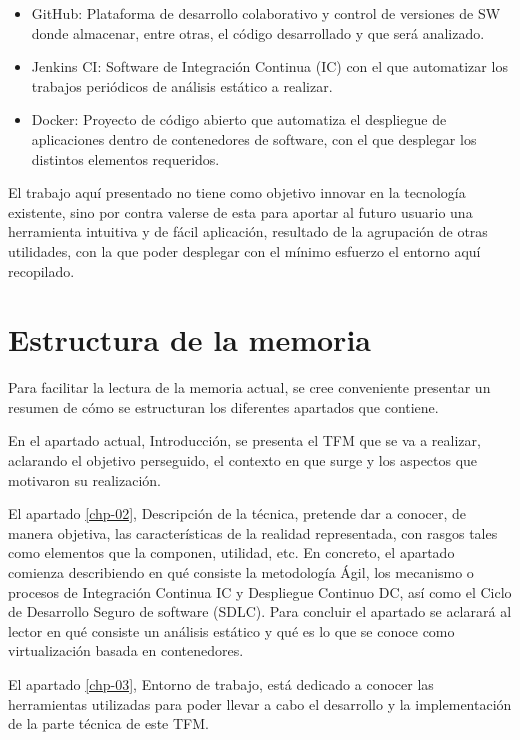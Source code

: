 \begin{itemize}
	\item GitHub\cite{github2017}: Plataforma de desarrollo colaborativo y control de versiones de \gls{SW} donde almacenar, entre otras, el código desarrollado y que será analizado.
	\item Jenkins \gls{CI}\cite{jenkins2017}: Software de Integración Continua (\gls{IC}) con el que automatizar los trabajos periódicos de análisis estático a realizar.
	\item Docker\cite{docker2017}: Proyecto de código abierto que automatiza el despliegue de aplicaciones dentro de contenedores de software, con el que desplegar los distintos elementos requeridos.
\end{itemize}

El trabajo aquí presentado no tiene como objetivo innovar en la tecnología existente, sino por contra valerse de esta para aportar al futuro usuario una herramienta intuitiva y de fácil aplicación, resultado de la agrupación de otras utilidades, con la que poder desplegar con el mínimo esfuerzo el entorno aquí recopilado. 

\section{Estructura de la memoria}


Para facilitar la lectura de la memoria actual, se cree conveniente presentar un resumen de cómo se estructuran los diferentes apartados que contiene.

En el apartado actual, Introducción, se presenta el \gls{TFM} que se va a realizar, aclarando el objetivo perseguido, el contexto en que surge y los aspectos que motivaron su realización.

El apartado \ref{chp-02}, Descripción de la técnica, pretende dar a conocer, de manera objetiva, las características de la realidad representada, con rasgos tales como elementos que la componen, utilidad, etc. En concreto, el apartado comienza describiendo en qué consiste la metodología Ágil, los mecanismo o procesos de Integración Continua \gls{IC} y Despliegue Continuo \gls{DC}, así como el Ciclo de Desarrollo Seguro de software (\gls{SDLC}). Para concluir el apartado se aclarará al lector en qué consiste un análisis estático y qué es lo que se conoce como virtualización basada en contenedores.

El apartado \ref{chp-03}, Entorno de trabajo, está dedicado a conocer las herramientas utilizadas para poder llevar a cabo el desarrollo y la implementación de la parte técnica de este \gls{TFM}.

